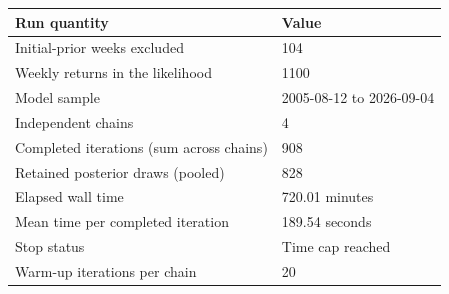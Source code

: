 \par\medskip\noindent
{\small
\begin{tabular}{@{}p{.58\linewidth}p{.34\linewidth}@{}}
\toprule
Run quantity & Value\\
\midrule
Initial-prior weeks excluded & 104\\
Weekly returns in the likelihood & 1100\\
Model sample & 2005-08-12 to 2026-09-04\\
Independent chains & 4\\
Completed iterations (sum across chains) & 908\\
Retained posterior draws (pooled) & 828\\
Elapsed wall time & 720.01 minutes\\
Mean time per completed iteration & 189.54 seconds\\
Stop status & Time cap reached\\
Warm-up iterations per chain & 20\\
\bottomrule
\end{tabular}
}
\par\medskip
